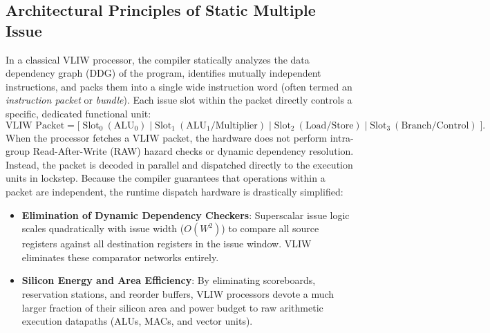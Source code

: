 \subsection{Architectural Principles of Static Multiple Issue}
In a classical VLIW processor, the compiler statically analyzes the data dependency graph (DDG) of the program, identifies mutually independent instructions, and packs them into a single wide instruction word (often termed an \emph{instruction packet} or \emph{bundle}). Each issue slot within the packet directly controls a specific, dedicated functional unit:
\begin{equation}
\text{VLIW Packet} = \big[ \;\text{Slot}_0 \ (\text{ALU}_0) \;\big|\; \text{Slot}_1 \ (\text{ALU}_1 / \text{Multiplier}) \;\big|\; \text{Slot}_2 \ (\text{Load/Store}) \;\big|\; \text{Slot}_3 \ (\text{Branch/Control}) \;\big].
\end{equation}
When the processor fetches a VLIW packet, the hardware does not perform intra-group Read-After-Write (RAW) hazard checks or dynamic dependency resolution. Instead, the packet is decoded in parallel and dispatched directly to the execution units in lockstep. Because the compiler guarantees that operations within a packet are independent, the runtime dispatch hardware is drastically simplified:
\begin{itemize}
    \item \textbf{Elimination of Dynamic Dependency Checkers}: Superscalar issue logic scales quadratically with issue width ($O(W^2)$) to compare all source registers against all destination registers in the issue window. VLIW eliminates these comparator networks entirely.
    \item \textbf{Silicon Energy and Area Efficiency}: By eliminating scoreboards, reservation stations, and reorder buffers, VLIW processors devote a much larger fraction of their silicon area and power budget to raw arithmetic execution datapaths (ALUs, MACs, and vector units).
\end{itemize}

